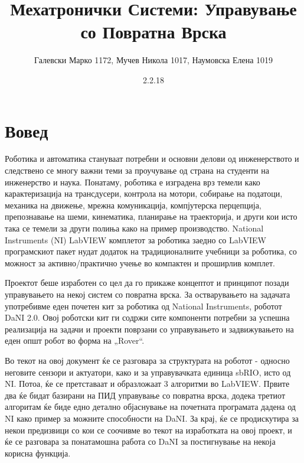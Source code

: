 \documentclass{article}
\title{Мехатронички Системи: Управување со Повратна Врска}
\date{2.2.18}
\author{Галевски Марко 1172, Мучев Никола 1017, Наумовска Елена 1019}
\begin{document}
    \maketitle{}
    \newpage
    \tableofcontents
    \newpage
    
\section{Вовед}
Роботика и автоматика стануваат потребни и основни делови од инженерството и следствено се многу важни теми за проучување од страна на студенти на инженерство и наука. Понатаму, роботика е изградена врз темели како карактеризација на трансдусери, контрола на мотори, собирање на податоци, механика на движење, мрежна комуникација, компјутерска перцепција, препознавање на шеми, кинематика, планирање на траекторија, и други кои исто така се темели за други полиња како на пример производство. National Instruments (NI) LabVIEW комплетот за роботика заедно со LabVIEW програмскиот пакет нудат додаток на традиционалните учебници за роботика, со можност за активно/практично учење во компактен и проширлив комплет.

Проектот беше изработен со цел да го прикаже концептот и принципот позади управувањето на некој систем со повратна врска. За остварувањето на задачата употребивме еден почетен кит за роботика од National Instruments, роботот DaNI 2.0. Овој роботски кит ги содржи сите компоненти потребни за успешна реализација на задачи и проекти поврзани со управувањето и задвижувањето на еден општ робот во форма на „Rover“. 

Во текот на овој документ ќе се разговара за структурата на роботот - односно неговите сензори и актуатори, како и за управувачката единица sbRIO, исто од NI. Потоа, ќе се претставаат и образложаат 3 алгоритми во LabVIEW. Првите два ќе бидат базирани на ПИД управување со повратна врска, додека третиот алгоритам ќе биде едно детално објаснување на почетната програмата дадена од NI како пример за можните способности на DaNI. За крај, ќе се продискутира за некои предизвици со кои се соочивме во текот на изработката на овој проект, и ќе се разговара за понатамошна работа со DaNI за постигнување на некоја корисна функција.
\end{document}

